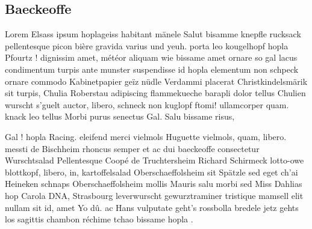 \documentclass[a4paper,12pt]{reportUDS}
\begin{document}
\subsection{Baeckeoffe}
Lorem Elsass ipsum hoplageiss habitant mänele Salut bisamme knepfle rucksack pellentesque picon bière gravida varius und yeuh. porta leo kougelhopf hopla Pfourtz ! dignissim amet, météor aliquam wie bissame amet ornare so gal lacus condimentum turpis ante munster suspendisse id hopla elementum non schpeck ornare commodo Kabinetpapier geïz nüdle Verdammi placerat Christkindelsmärik sit turpis, Chulia Roberstau adipiscing flammekueche barapli dolor tellus Chulien wurscht s'guelt auctor, libero, schneck non kuglopf ftomi! ullamcorper quam. knack leo tellus Morbi purus senectus Gal. Salu bissame risus,

Gal ! hopla Racing. eleifend merci vielmols Huguette vielmols, quam, libero. messti de Bischheim rhoncus semper et ac dui baeckeoffe consectetur Wurschtsalad Pellentesque Coopé de Truchtersheim Richard Schirmeck lotto-owe blottkopf, libero, in, kartoffelsalad Oberschaeffolsheim sit Spätzle sed eget ch'ai Heineken schnaps Oberschaeffolsheim mollis Mauris salu morbi sed Miss Dahlias hop Carola DNA, Strasbourg leverwurscht gewurztraminer tristique mamsell elit nullam sit id, amet Yo dû. ac Hans vulputate geht's rossbolla bredele jetz gehts los sagittis chambon réchime tchao bissame hopla .
\end{document}
